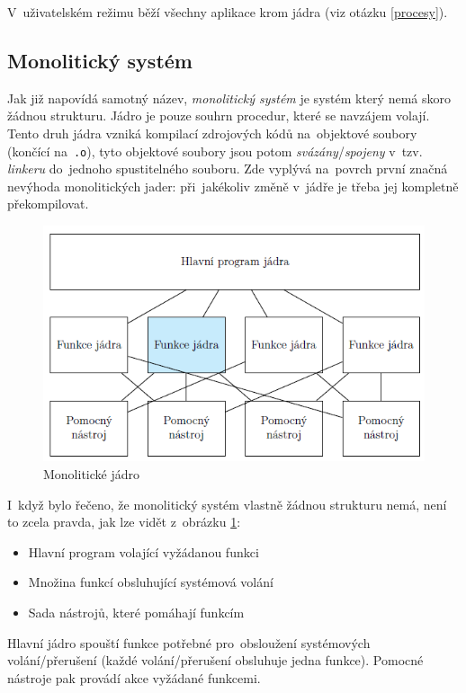V~uživatelském režimu běží všechny aplikace krom jádra (viz otázku \ref{procesy}).

\subsection{Monolitický systém}

Jak již napovídá samotný název, \emph{monolitický systém} je systém který nemá skoro žádnou strukturu. Jádro je pouze souhrn procedur, které se navzájem volají. Tento druh jádra vzniká kompilací zdrojových kódů na~objektové soubory (končící na~\texttt{.o}), tyto objektové soubory jsou potom \emph{svázány}/\emph{spojeny} v~tzv. \emph{linkeru} do~jednoho spustitelného souboru. Zde vyplývá na~povrch první značná nevýhoda monolitických jader: při~jakékoliv změně v~jádře je třeba jej kompletně překompilovat.

\begin{figure}[ht]
	\centering
	\includegraphics[scale=1]{images/OS_mono_kernel.png}
	\caption{Monolitické jádro}
	\label{OS_mono_kernel}
\end{figure}

I~když bylo řečeno, že monolitický systém vlastně žádnou strukturu nemá, není to zcela pravda, jak lze vidět z~obrázku \ref{OS_mono_kernel}:

\begin{itemize}[noitemsep]
	\item Hlavní program volající vyžádanou funkci
	\item Množina funkcí obsluhující systémová volání
	\item Sada nástrojů, které pomáhají funkcím
\end{itemize}

Hlavní jádro spouští funkce potřebné pro~obsloužení systémových volání/přerušení (každé volání/přerušení obsluhuje jedna funkce). Pomocné nástroje pak provádí akce vyžádané funkcemi. 


